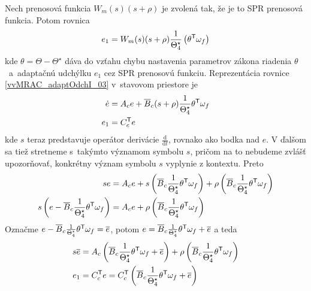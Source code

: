 \documentclass[a4paper, 10pt, ]{article}
\begin{document}
Nech prenosová funkcia $W_m(s) (s+\rho)$ je zvolená tak, že je to SPR prenosová funkcia. Potom rovnica
\begin{equation}  \label{vvMRAC_adaptOdchI_03}
	e_1 = W_m(s) (s+\rho) \frac{1}{\Theta_4^\star} \left( {\theta}^{\mathsf{T}} \omega_f \right)
\end{equation}
kde $\theta = \Theta - \Theta^\star$ dáva do vzťahu chybu nastavenia parametrov zákona riadenia $\theta$~a~adaptačnú udchýlku $e_1$ cez SPR prenosovú funkciu. Reprezentácia rovnice \eqref{vvMRAC_adaptOdchI_03} v~stavovom priestore je
\begin{subequations} \label{vvMRAC_adaptOdchISS}
	\begin{align}
		\dot{e} &= A_c e + \overline{B}_c (s+\rho) \frac{1}{\Theta_4^\star} \theta^{\mathsf{T}} \omega_f \\
		e_1 &= C_c^{\mathsf{T}} e
	\end{align}
\end{subequations}
kde $s$ teraz predstavuje operátor derivácie $\frac{\text{d}}{\text{d}t}$, rovnako ako bodka \uv{$\,\dot{}\,$} nad $e$. V ďalšom sa tiež stretneme s~takýmto významom symbolu $s$, pričom na to nebudeme zvlášť upozorňovať, konkrétny význam symbolu $s$ vyplynie z kontextu. Preto
\begin{subequations}
	\begin{align}
		se &= A_c e + s \left( \overline{B}_c \frac{1}{\Theta_4^\star} \theta^{\mathsf{T}} \omega_f \right) + \rho \left( \overline{B}_c \frac{1}{\Theta_4^\star} \theta^{\mathsf{T}} \omega_f \right) \\
		s \left( e - \overline{B}_c \frac{1}{\Theta_4^\star} \theta^{\mathsf{T}} \omega_f \right) &= A_c e + \rho \left( \overline{B}_c \frac{1}{\Theta_4^\star} \theta^{\mathsf{T}} \omega_f \right)
		\end{align}
\end{subequations}
Označme $e - \overline{B}_c \frac{1}{\Theta_4^\star} \theta^{\mathsf{T}} \omega_f = \overline{e} $, potom $e = \overline{B}_c \frac{1}{\Theta_4^\star} \theta^{\mathsf{T}} \omega_f + \overline{e} $ a teda
\begin{subequations}
	\begin{align}
		s \overline{e} &= A_c \left( \overline{B}_c \frac{1}{\Theta_4^\star} \theta^{\mathsf{T}} \omega_f + \overline{e} \right) + \rho \left( \overline{B}_c \frac{1}{\Theta_4^\star} \theta^{\mathsf{T}} \omega_f \right) \\
		e_1 &= C_c^{\mathsf{T}} e = C_c^{\mathsf{T}} \left( \overline{B}_c \frac{1}{\Theta_4^\star} \theta^{\mathsf{T}} \omega_f + \overline{e} \right)
	\end{align}
\end{subequations}
\end{document}
